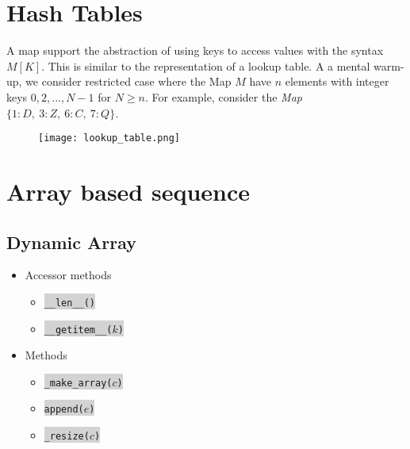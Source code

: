 \documentclass[10pt]{article}
\newcommand{\code}[1]{{\small\colorbox{LightGray}{\texttt{#1}}}}
\begin{document}
\section{Hash Tables}
A map support the abstraction of using keys to access values with the syntax $M[K]$. This is similar to the representation of a lookup table. A a mental warm-up, we consider restricted case where the Map $M$ have $n$ elements with integer keys $0,2,...,N-1$ for $N\geq n$. For example, consider the \textit{Map} $\{1\colon D,~3\colon Z,~6\colon C,~7\colon Q\}$.

\begin{figure}
	\texttt{[image: lookup\_table.png]}
\end{figure}
  
\section{Array based sequence}

\subsection{Dynamic Array}

\begin{itemize}
	\item Accessor methods
	\begin{itemize}
		\item[] \code{\_\_len\_\_()}
		\item[] \code{\_\_getitem\_\_($k$)}
	\end{itemize}		
	\item Methods
	\begin{itemize}
		\item[] \code{\_make\_array($c$)}
		\item[] \code{append($e$)}
		\item[] \code{\_resize($c$)} 
	\end{itemize}
\end{itemize}
\end{document}
